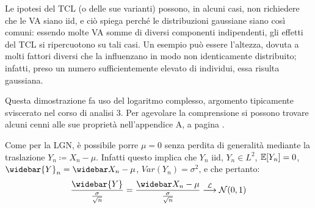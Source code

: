 Le ipotesi del TCL (o delle sue varianti) possono, in alcuni casi, non richiedere che le VA siano iid, e ciò spiega perché le distribuzioni gaussiane siano così comuni: essendo molte VA somme di diversi componenti indipendenti, gli effetti del TCL si ripercuotono su tali casi.
Un esempio può essere l'altezza, dovuta a molti fattori diversi che la influenzano in modo non identicamente distribuito; infatti, preso un numero sufficientemente elevato di individui, essa risulta gaussiana.


\medskip
\begin{dimo}
	Questa dimostrazione fa uso del logaritmo complesso, argomento tipicamente sviscerato nel corso di analisi 3.
	Per agevolare la comprensione si possono trovare alcuni cenni alle sue proprietà nell'appendice A, a pagina \pageref{log-complesso}.

  Come per la LGN, è possibile porre $\mu = 0$ senza perdita di generalità mediante la traslazione $Y_n \coloneqq X_n - \mu$.
  Infatti questo implica che $Y_n$ iid,  $Y_n \in L^2$, $\mathbb E [Y_n] = 0$, $\widebar{Y}_n = \widebar X_n - \mu$, $Var(Y_n) = \sigma^2$, e che pertanto:
  $$\frac{\widebar{Y}}{\frac{\sigma}{\sqrt{n}}} = \frac{\widebar X_n - \mu}{\frac{\sigma}{\sqrt{n}}} \stackrel{\Lc}{\longrightarrow} \Nc(0,1)$$


\end{dimo}
